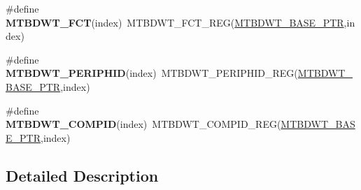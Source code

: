 \begin{DoxyCompactItemize}
\item 
\mbox{\label{group___m_t_b_d_w_t___register___accessor___macros_ga298082c69f94527d1e20a31e425f0008}} 
\#define {\bfseries M\+T\+B\+D\+W\+T\+\_\+\+F\+CT}(index)~M\+T\+B\+D\+W\+T\+\_\+\+F\+C\+T\+\_\+\+R\+EG(\hyperlink{group___m_t_b_d_w_t___peripheral_ga97d048bfb5a11293a38c444b8347ff42}{M\+T\+B\+D\+W\+T\+\_\+\+B\+A\+S\+E\+\_\+\+P\+TR},index)
\item 
\mbox{\label{group___m_t_b_d_w_t___register___accessor___macros_ga8539caea63d1d42dee52ab3ffd2f9e76}} 
\#define {\bfseries M\+T\+B\+D\+W\+T\+\_\+\+P\+E\+R\+I\+P\+H\+ID}(index)~M\+T\+B\+D\+W\+T\+\_\+\+P\+E\+R\+I\+P\+H\+I\+D\+\_\+\+R\+EG(\hyperlink{group___m_t_b_d_w_t___peripheral_ga97d048bfb5a11293a38c444b8347ff42}{M\+T\+B\+D\+W\+T\+\_\+\+B\+A\+S\+E\+\_\+\+P\+TR},index)
\item 
\mbox{\label{group___m_t_b_d_w_t___register___accessor___macros_ga33c7aa399974b7371ca1fa780b9d1d62}} 
\#define {\bfseries M\+T\+B\+D\+W\+T\+\_\+\+C\+O\+M\+P\+ID}(index)~M\+T\+B\+D\+W\+T\+\_\+\+C\+O\+M\+P\+I\+D\+\_\+\+R\+EG(\hyperlink{group___m_t_b_d_w_t___peripheral_ga97d048bfb5a11293a38c444b8347ff42}{M\+T\+B\+D\+W\+T\+\_\+\+B\+A\+S\+E\+\_\+\+P\+TR},index)
\end{DoxyCompactItemize}


\subsection{Detailed Description}
